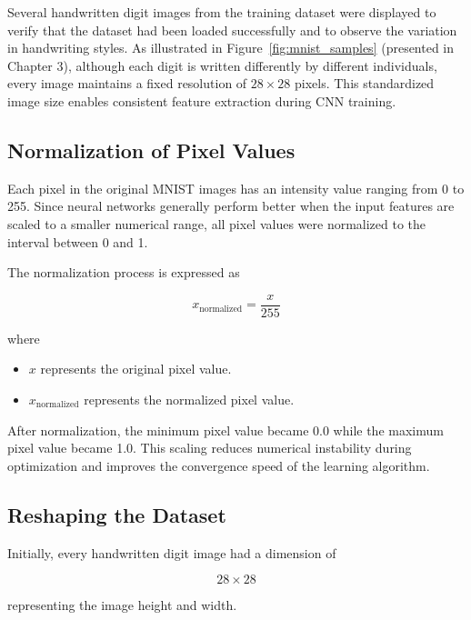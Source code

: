 Several handwritten digit images from the training dataset were displayed to verify that the dataset had been loaded successfully and to observe the variation in handwriting styles. As illustrated in Figure~\ref{fig:mnist_samples} (presented in Chapter 3), although each digit is written differently by different individuals, every image maintains a fixed resolution of $28 \times 28$ pixels. This standardized image size enables consistent feature extraction during CNN training.

\subsection{Normalization of Pixel Values}

Each pixel in the original MNIST images has an intensity value ranging from 0 to 255. Since neural networks generally perform better when the input features are scaled to a smaller numerical range, all pixel values were normalized to the interval between 0 and 1.

The normalization process is expressed as

\begin{equation}
x_{\mathrm{normalized}}=\frac{x}{255}
\end{equation}

where

\begin{itemize}
    \item $x$ represents the original pixel value.
    \item $x_{\mathrm{normalized}}$ represents the normalized pixel value.
\end{itemize}

After normalization, the minimum pixel value became 0.0 while the maximum pixel value became 1.0. This scaling reduces numerical instability during optimization and improves the convergence speed of the learning algorithm\cite{goodfellow2016deep}.

\subsection{Reshaping the Dataset}

Initially, every handwritten digit image had a dimension of

\[
28 \times 28
\]

representing the image height and width.

